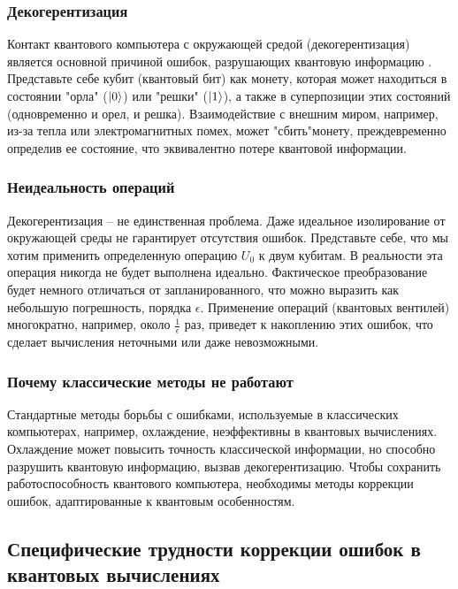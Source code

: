 \documentclass[12pt,a4paper]{article}
\begin{document}
\subsubsection{Декогерентизация}

Контакт квантового компьютера с окружающей средой (декогерентизация) является основной причиной ошибок, разрушающих квантовую информацию \cite{Preskill}. Представьте себе кубит (квантовый бит) как монету, которая может находиться в состоянии "орла" (\(\ket{0}\)) или "решки" (\(\ket{1}\)), а также в суперпозиции этих состояний (одновременно и орел, и решка). Взаимодействие с внешним миром, например, из-за тепла или электромагнитных помех, может "сбить"\quad  монету, преждевременно определив ее состояние, что эквивалентно потере квантовой информации.

\subsubsection{Неидеальность операций}

Декогерентизация – не единственная проблема. Даже идеальное изолирование от окружающей среды не гарантирует отсутствия ошибок. Представьте себе, что мы хотим применить определенную операцию \(U_0\) к двум кубитам. В реальности эта операция никогда не будет выполнена идеально. Фактическое преобразование будет немного отличаться от запланированного, что можно выразить как небольшую погрешность, порядка \(\epsilon\). Применение операций (квантовых вентилей) многократно, например, около \(\frac{1}{\epsilon}\) раз, приведет к накоплению этих ошибок, что сделает вычисления неточными или даже невозможными.

\subsubsection{Почему классические методы не работают}

Стандартные методы борьбы с ошибками, используемые в классических компьютерах, например, охлаждение, неэффективны в квантовых вычислениях. Охлаждение может повысить точность классической информации, но способно разрушить квантовую информацию, вызвав декогерентизацию. Чтобы сохранить работоспособность квантового компьютера, необходимы методы коррекции ошибок, адаптированные к квантовым особенностям.

\subsection{Специфические трудности коррекции ошибок в квантовых вычислениях}
\end{document}
